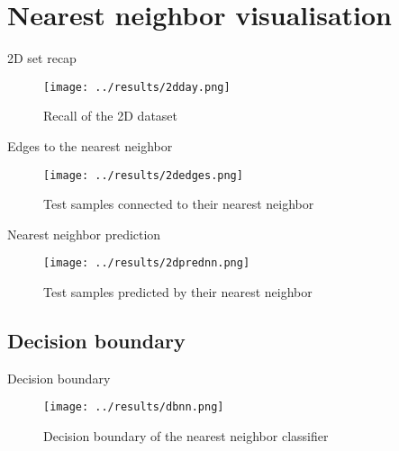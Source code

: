 \section{Nearest neighbor visualisation}

\begin{frame}{2D set recap}
  \begin{figure}[!htbp]
    \centering
    \small{\caption{Recall of the 2D dataset}}
    \texttt{[image: ../results/2dday.png]}
  \end{figure}
\end{frame}

\begin{frame}{Edges to the nearest neighbor}
  \begin{figure}[!htbp]
    \centering
    \small{\caption{Test samples connected to their nearest neighbor}}
    \texttt{[image: ../results/2dedges.png]}
  \end{figure}
\end{frame}

\begin{frame}{Nearest neighbor prediction}
  \begin{figure}[!htbp]
    \centering
    \small{\caption{Test samples predicted by their nearest neighbor}}
    \texttt{[image: ../results/2dprednn.png]}
  \end{figure}
\end{frame}

\subsection{Decision boundary}

\begin{frame}{Decision boundary}
  \begin{figure}[!htbp]
    \centering
    \small{\caption{Decision boundary of the nearest neighbor classifier}}
    \texttt{[image: ../results/dbnn.png]}
  \end{figure}
\end{frame}
